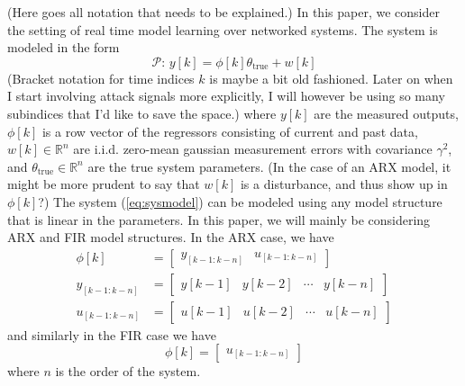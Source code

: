 
{\color{red}(Here goes all notation that needs to be explained.)}
In this paper, we consider the setting of real time model learning over
networked  systems. The system is modeled in the form
\begin{equation}
        \mathcal{P}:\, y[k] = \phi[k]\theta_{\text{true}} + w[k]
        \label{eq:sysmodel}
\end{equation}
{\color{red}(Bracket notation for time indices $k$ is maybe a bit old fashioned.
Later on when I start involving attack signals more explicitly, I will however be using so many
subindices that I'd like to save the space.)}
where $y[k]$ are the measured outputs, $\phi[k]$ is a row vector of
the regressors consisting of current and past data, $w[k] \in \mathbb{R}^n$
are i.i.d. zero-mean gaussian measurement errors with covariance $\gamma^2$, and
$\theta_{\text{true}} \in \mathbb{R}^n$ are the true system parameters.
{\color{red}(In the case of an ARX model, it might be more prudent to say that
$w[k]$ is a disturbance, and thus show up in $\phi[k]$?)}
The system (\ref{eq:sysmodel}) can be modeled using any model structure that
is linear in the parameters. In this paper, we will mainly be considering
ARX and FIR model structures. In the ARX case, we have
\begin{equation}
        \begin{split}
                \phi[k] &= \begin{bmatrix}
                        y_{[k-1:k-n]} & u_{[k-1:k-n]}  
                \end{bmatrix} \\
                y_{[k-1:k-n]} &= \begin{bmatrix}
                        y[k-1] & y[k-2] & \cdots & y[k-n]
                \end{bmatrix} \\
                u_{[k-1:k-n]}  &= \begin{bmatrix}
                        u[k-1] & u[k-2] & \cdots & u[k-n]
                \end{bmatrix}
        \end{split}
\end{equation}
and similarly in the FIR case we have
\begin{equation}
        \phi[k] = \begin{bmatrix}
                u_{[k-1:k-n]}  
        \end{bmatrix}
\end{equation}
where $n$ is the order of the system. \cite{ljung_system_1999}

